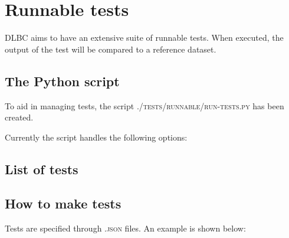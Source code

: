 \documentclass{article}
\begin{document}
\section{Runnable tests}

DLBC aims to have an extensive suite of runnable tests. When executed, the output of the test will be compared to a reference dataset.

\subsection{The Python script}

To aid in managing tests, the script \textsc{./tests/runnable/run-tests.py} has been created.

Currently the script handles the following options:



\subsection{List of tests}



\subsection{How to make tests}

Tests are specified through \textsc{.json} files. An example is shown below:


\end{document}
